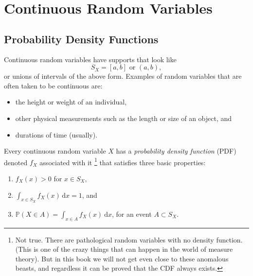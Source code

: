 \documentclass[captions=tableheading]{scrbook}
\begin{document}
\section{Continuous Random Variables}
\label{sec-6-1}
\label{sec-continuous-random-variables}
\subsection{Probability Density Functions}
\label{sec-6-1-1}
\label{sub-probability-density-functions}


Continuous random variables have supports that look like
\begin{equation}
S_{X}=[a,b]\mbox{ or }(a,b),
\end{equation}
or unions of intervals of the above form. Examples of random variables that are often taken to be continuous are:

\begin{itemize}
\item the height or weight of an individual,
\item other physical measurements such as the length or size of an object, and
\item durations of time (usually).
\end{itemize}

Every continuous random variable \(X\) has a \emph{probability density function} (PDF) denoted \(f_{X}\) associated with it
\footnote{Not true. There are pathological random variables with no density function. (This is one of the crazy things that can happen in the world of measure theory). But in this book we will not get even close to these anomalous beasts, and regardless it can be proved that the CDF always exists.}
that satisfies three basic properties:
\begin{enumerate}
\item \(f_{X}(x)>0\) for \(x\in S_{X}\),
\item \(\int_{x\in S_{X}}f_{X}(x)\,\mathrm{d} x=1\), and
\item \(\mathbb{P}(X\in A)=\int_{x\in A}f_{X}(x)\:\mathrm{d} x\), for an event \(A\subset S_{X}\).
\end{enumerate}
\end{document}
